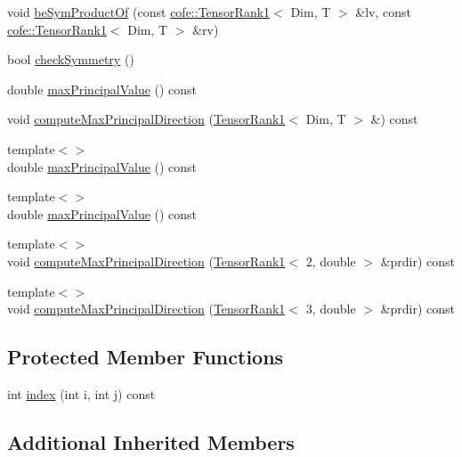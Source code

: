 \begin{DoxyCompactItemize}
\item 
void \hyperlink{classcofe_1_1TensorRank2Sym_a7f8161e73cdc617cfcdb37335090e300}{be\-Sym\-Product\-Of} (const \hyperlink{classcofe_1_1TensorRank1}{cofe\-::\-Tensor\-Rank1}$<$ Dim, T $>$ \&lv, const \hyperlink{classcofe_1_1TensorRank1}{cofe\-::\-Tensor\-Rank1}$<$ Dim, T $>$ \&rv)
\item 
bool \hyperlink{classcofe_1_1TensorRank2Sym_a838b74665c17b6d60d9e342ff05d4420}{check\-Symmetry} ()
\item 
double \hyperlink{classcofe_1_1TensorRank2Sym_a65bfec60122f7a9481da5600f22ac19e}{max\-Principal\-Value} () const 
\item 
void \hyperlink{classcofe_1_1TensorRank2Sym_a413471819e725139194b6b9ae14ee69e}{compute\-Max\-Principal\-Direction} (\hyperlink{classcofe_1_1TensorRank1}{Tensor\-Rank1}$<$ Dim, T $>$ \&) const 
\item 
{\footnotesize template$<$$>$ }\\double \hyperlink{classcofe_1_1TensorRank2Sym_a254cc6a7bc8ae2997ce4975ba20f965f}{max\-Principal\-Value} () const
\item 
{\footnotesize template$<$$>$ }\\double \hyperlink{classcofe_1_1TensorRank2Sym_aff828ae4400856cb142f0bb4f822edf4}{max\-Principal\-Value} () const
\item 
{\footnotesize template$<$$>$ }\\void \hyperlink{classcofe_1_1TensorRank2Sym_a0d927eea62fecfcfbe37e74812cbd390}{compute\-Max\-Principal\-Direction} (\hyperlink{classcofe_1_1TensorRank1}{Tensor\-Rank1}$<$ 2, double $>$ \&prdir) const
\item 
{\footnotesize template$<$$>$ }\\void \hyperlink{classcofe_1_1TensorRank2Sym_aabfa3c3f2045a08766dc774625410e34}{compute\-Max\-Principal\-Direction} (\hyperlink{classcofe_1_1TensorRank1}{Tensor\-Rank1}$<$ 3, double $>$ \&prdir) const
\end{DoxyCompactItemize}
\subsection*{Protected Member Functions}
\begin{DoxyCompactItemize}
\item 
int \hyperlink{classcofe_1_1TensorRank2Sym_ab26fa8983ef339411fde00df322a4375}{index} (int i, int j) const 
\end{DoxyCompactItemize}
\subsection*{Additional Inherited Members}


